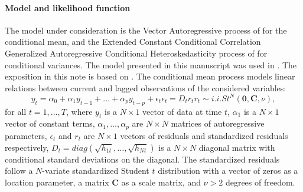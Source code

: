 \documentclass[final,3p,authoryear]{elsarticle}
\begin{document}
\paragraph{Model and likelihood function} The model under consideration is the Vector Autoregressive process of \cite{Sims1980} for the conditional mean, and the Extended Constant Conditional Correlation Generalized Autoregressive Conditional Heteroskedasticity process of \cite{Jeantheau1998} for conditional variances. The model presented in this manuscript was used in \cite{Wozniak2012,Wozniak2011jm}. The exposition in this note is based on \cite{Wozniak2012}.  The conditional mean process models linear relations between current and lagged observations of the considered variables:
\begin{subequations}\label{eq:mean}
\begin{equation}\label{eq:var}
y_t = \alpha_0 + \alpha_1y_{t-1} + \dots + \alpha_py_{t-p} + \epsilon_t 
\end{equation} 
\begin{equation}\label{eq:epsilon2}
\epsilon_t = D_t r_t
\end{equation} 
\begin{equation}\label{eq:t}
r_t \sim i.i.St^{N}\left( \mathbf{0}, \mathbf{C}, \nu \right),
\end{equation} 
\end{subequations}
for all $t=1,\dots,T$, where $y_t$ is a $N\times 1$ vector of data at time $t$, $\alpha_1$ is a $N\times1$ vector of constant terms, $\alpha_1,\dots,\alpha_p$ are $N\times N$ matrices of autoregressive parameters, $\epsilon_t$ and $r_t$ are $N\times 1$ vectors of residuals and standardized residuals respectively, $D_t = diag(\sqrt{h_{1t}},\dots, \sqrt{h_{Nt}})$ is a $N\times N$ diagonal matrix with conditional standard deviations on the diagonal. The standardized residuals follow a $N$-variate standardized Student $t$ distribution with a vector of zeros as a location parameter, a matrix $\mathbf{C}$ as a scale matrix, and $\nu>2$ degrees of freedom.
\end{document}
